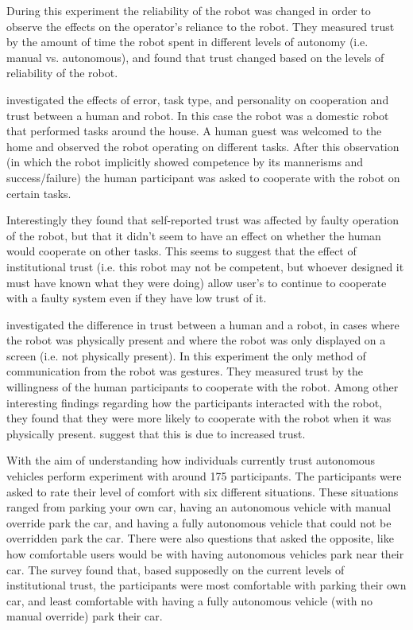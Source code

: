 During this experiment the reliability of the robot was changed in order to observe the effects on the operator's reliance to the robot. They measured trust by the amount of time the robot spent in different levels of autonomy (i.e. manual vs. autonomous), and found that trust changed based on the levels of reliability of the robot.

\citet{Salem2015-md} investigated the effects of error, task type, and personality on cooperation and trust between a human and robot. In this case the robot was a domestic robot that performed tasks around the house. A human guest was welcomed to the home and observed the robot operating on different tasks. After this observation (in which the robot implicitly showed competence by its mannerisms and success/failure) the human participant was asked to cooperate with the robot on certain tasks.

Interestingly they found that self-reported trust was affected by faulty operation of the robot, but that it didn't seem to have an effect on whether the human would cooperate on other tasks. This seems to suggest that the effect of institutional trust (i.e. this robot may not be competent, but whoever designed it must have known what they were doing) allow user's to continue to cooperate with a faulty system even if they have low trust of it.

\citet{Bainbridge2011-pl} investigated the difference in trust between a human and a robot,  in cases where the robot was physically present and where the robot was only displayed on a screen (i.e. not physically present). In this experiment the only method of communication from the robot was gestures. They measured trust by the willingness of the human participants to cooperate with the robot. Among other interesting findings regarding how the participants interacted with the robot, they found that they were more likely to cooperate with the robot when it was physically present. \citeauthor{Bainbridge2011-pl} suggest that this is due to increased trust.

With the aim of understanding how individuals currently trust autonomous vehicles \citet{Munjal_Desai2009-en} perform experiment with around 175 participants. The participants were asked to rate their level of comfort with six different situations. These situations ranged from parking your own car, having an autonomous vehicle with manual override park the car, and having a fully autonomous vehicle that could not be overridden park the car. There were also questions that asked the opposite, like how comfortable users would be with having autonomous vehicles park near their car. The survey found that, based supposedly on the current levels of institutional trust, the participants were most comfortable with parking their own car, and least comfortable with having a fully autonomous vehicle (with no manual override) park their car.


